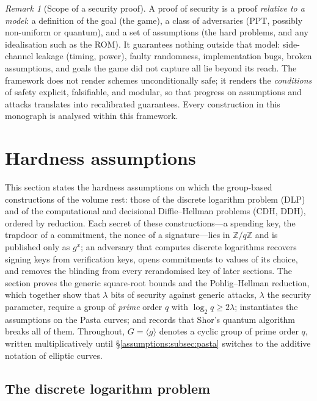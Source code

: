 \documentclass[11pt,a4paper]{article}
\theoremstyle{definition}
\theoremstyle{remark}
\newtheorem{remark}[theorem]{Remark}
\newcommand{\Z}{\ensuremath{\mathbb{Z}}}
\begin{document}
\begin{remark}[Scope of a security proof]
\label{model:rem:scope}
A proof of security is a proof \emph{relative to a model}: a
definition of the goal (the game), a class of adversaries (PPT,
possibly non-uniform or quantum), and a set of assumptions (the hard
problems, and any idealisation such as the ROM). It guarantees nothing
outside that model: side-channel leakage (timing, power), faulty
randomness, implementation bugs, broken assumptions, and goals the
game did not capture all lie beyond its reach. The framework does not
render schemes unconditionally safe; it renders the
\emph{conditions} of safety explicit, falsifiable, and modular, so
that progress on assumptions and attacks translates into recalibrated
guarantees. Every construction in this monograph is analysed within
this framework.
\end{remark}

\section{Hardness assumptions}\label{sec:assumptions}

This section states the hardness assumptions on which the group-based
constructions of the volume rest: those of the discrete logarithm
problem (DLP) and of the computational and decisional Diffie--Hellman
problems (CDH, DDH), ordered by reduction. Each secret of these
constructions---a spending key, the trapdoor of a commitment, the nonce of a
signature---lies in \(\Z/q\Z\) and is published only as \(g^{x}\); an
adversary that computes discrete logarithms recovers signing keys from
verification keys, opens commitments to values of its choice, and
removes the blinding from every rerandomised key of later sections. The
section proves the generic square-root bounds and the Pohlig--Hellman
reduction, which together show that \(\lambda\) bits of security against
generic attacks, \(\lambda\) the security parameter, require a group of
\emph{prime} order \(q\) with \(\log_2 q \ge 2\lambda\); instantiates
the assumptions on the Pasta curves; and records that Shor's quantum
algorithm breaks all of them.
Throughout, \(G = \langle g\rangle\) denotes a cyclic group of prime
order \(q\), written multiplicatively until
\S\ref{assumptions:subsec:pasta} switches to the additive notation of
elliptic curves.

\subsection{The discrete logarithm problem}
\label{assumptions:subsec:dlp}
\end{document}
